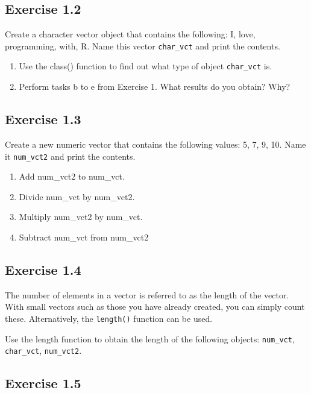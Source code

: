 \documentclass[
]{book}
\providecommand{\tightlist}{%
  \setlength{\itemsep}{0pt}\setlength{\parskip}{0pt}}
\begin{document}
\hypertarget{exercise-1.2}{%
\subsection{Exercise 1.2}\label{exercise-1.2}}

Create a character vector object that contains the following: I, love, programming, with, R. Name this vector \texttt{char\_vct} and print the contents.

\begin{enumerate}
\def\labelenumi{\alph{enumi}.}
\tightlist
\item
  Use the class() function to find out what type of object \texttt{char\_vct} is.
\item
  Perform tasks b to e from Exercise 1. What results do you obtain? Why?
\end{enumerate}

\hypertarget{exercise-1.3}{%
\subsection{Exercise 1.3}\label{exercise-1.3}}

Create a new numeric vector that contains the following values: 5, 7, 9, 10. Name it \texttt{num\_vct2} and print the contents.

\begin{enumerate}
\def\labelenumi{\alph{enumi}.}
\tightlist
\item
  Add num\_vct2 to num\_vct.
\item
  Divide num\_vct by num\_vct2.
\item
  Multiply num\_vct2 by num\_vct.
\item
  Subtract num\_vct from num\_vct2
\end{enumerate}

\hypertarget{exercise-1.4}{%
\subsection{Exercise 1.4}\label{exercise-1.4}}

The number of elements in a vector is referred to as the length of the vector. With small vectors such as those you have already created, you can simply count these. Alternatively, the \texttt{length()} function can be used.

Use the length function to obtain the length of the following objects: \texttt{num\_vct}, \texttt{char\_vct}, \texttt{num\_vct2}.

\hypertarget{exercise-1.5}{%
\subsection{Exercise 1.5}\label{exercise-1.5}}
\end{document}
